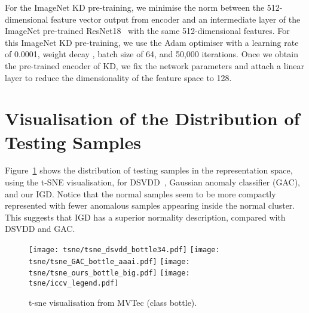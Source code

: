 \documentclass[letterpaper]{article} \usepackage{aaai22}  \usepackage{times}  \usepackage{helvet}  \usepackage{courier}  \usepackage[hyphens]{url}  \usepackage{graphicx} \urlstyle{rm} \def\UrlFont{\rm}  \usepackage{natbib}  \usepackage{caption} \DeclareCaptionStyle{ruled}{labelfont=normalfont,labelsep=colon,strut=off} \frenchspacing  \setlength{\pdfpagewidth}{8.5in}  \setlength{\pdfpageheight}{11in}  \usepackage{algorithm}
\begin{document}
For the ImageNet KD pre-training, we minimise the  norm between the 512-dimensional feature vector output from encoder and an intermediate layer of the ImageNet pre-trained ResNet18~\cite{resnet} with the same 512-dimensional features.
For this ImageNet KD pre-training, we use the Adam optimiser with a learning rate of 0.0001,  weight decay , batch size of 64, and 50,000 iterations. Once we obtain the pre-trained encoder of KD, we fix the network parameters 
and attach a linear layer to reduce the dimensionality of the feature space to 128.



\section{Visualisation of the Distribution of Testing Samples}

Figure~\ref{fig:mvtec_tsne} shows the distribution of testing samples in the representation space, using the t-SNE visualisation, for DSVDD~\cite{dsvdd}, Gaussian anomaly classifier (GAC), and our IGD. Notice that the normal samples seem to be more compactly represented with fewer anomalous samples appearing inside the normal cluster. This suggests that IGD has a superior normality description, compared with DSVDD and GAC.

\begin{figure}[H]
  \centering
\texttt{[image: tsne/tsne\_dsvdd\_bottle34.pdf]}
    \texttt{[image: tsne/tsne\_GAC\_bottle\_aaai.pdf]}
    \texttt{[image: tsne/tsne\_ours\_bottle\_big.pdf]}
    \texttt{[image: tsne/iccv\_legend.pdf]}
    \caption{
    t-sne visualisation from MVTec (class bottle). 
    } 
    \label{fig:mvtec_tsne}
\end{figure}
\vspace{-.33cm}
\end{document}
